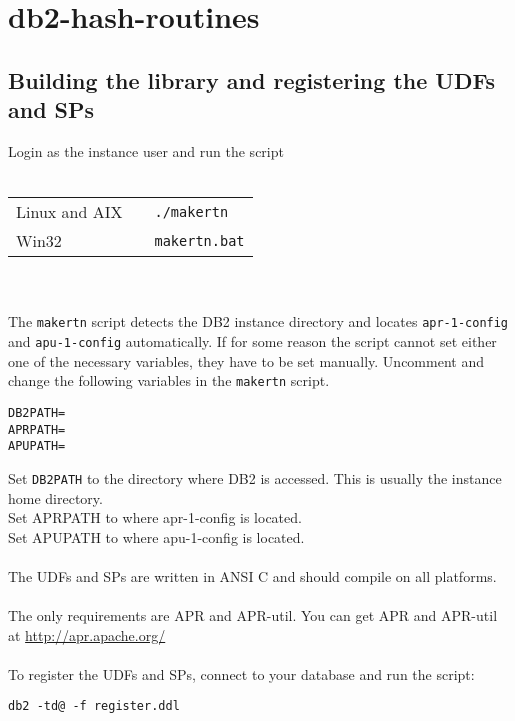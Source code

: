 \section{db2-hash-routines}
\subsection{Building the library and registering the UDFs and SPs}
Login as the instance user and run the script\\
\\
\begin{tabular}{@{} lll @{}}
Linux and AIX & & {\tt ./makertn}\\
Win32         & & {\tt makertn.bat}\\
\end{tabular}
\\\\
The {\tt makertn} script detects the DB2 instance directory and locates {\tt apr-1-config} and {\tt apu-1-config} automatically. If for some reason the script cannot set either one of the necessary variables, they have to be set manually.
Uncomment and change the following variables in the {\tt makertn} script.
\begin{verbatim}
DB2PATH=
APRPATH=
APUPATH=
\end{verbatim}
Set {\tt DB2PATH} to the directory where DB2 is accessed. This is usually the instance home directory.\\
Set APRPATH to where apr-1-config is located.\\
Set APUPATH to where apu-1-config is located.\\
\\
The UDFs and SPs are written in ANSI C and should compile on all platforms.\\
\\
The only requirements are APR and \mbox{APR-util}.
You can get APR and APR-util at \url{http://apr.apache.org/} \\
\\
To register the UDFs and SPs, connect to your database and run the script:
\begin{verbatim}
db2 -td@ -f register.ddl
\end{verbatim}
\newpage
